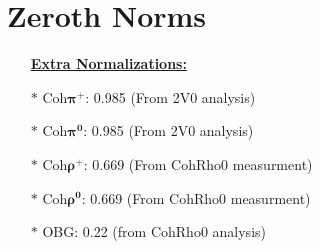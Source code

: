 \documentclass{article}
\newcommand{\bstar}{{\color{blue}$\boldsymbol{\ast}$}}
\begin{document}

\maketitle

\vspace{\fill}




\clearpage\newpage

\section{Zeroth Norms}
\label{sec-zeroth-norms}



\vspace{5ex}



\vspace{5ex}
\begin{itemize}
\item[] \textbf{\underline{\color{dviolet} Extra Normalizations:}}
\item[\bstar] Coh$\boldsymbol{\pi^+}$: 0.985 \;\;\; (From 2V0 analysis)
\item[\bstar] Coh$\boldsymbol{\pi^0}$: 0.985 \;\;\; (From 2V0 analysis)
\item[\bstar] Coh$\boldsymbol{\rho^+}$: 0.669 \;\;\; (From CohRho0 measurment)
\item[\bstar] Coh$\boldsymbol{\rho^0}$: 0.669 \;\;\; (From CohRho0 measurment)
\item[\bstar] OBG: 0.22 (from CohRho0 analysis)
\end{itemize}
\end{document}

